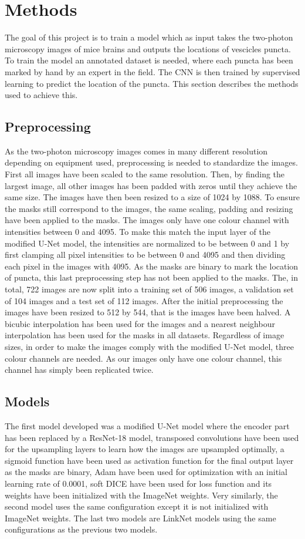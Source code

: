 \section{Methods}
The goal of this project is to train a model which as input takes the two-photon microscopy images of mice brains and outputs the locations of vescicles puncta. To train the model an annotated dataset is needed, where each puncta has been marked by hand by an expert in the field. The CNN is then trained by supervised learning to predict the location of the puncta. This section describes the methods used to achieve this.

\subsection{Preprocessing}
As the two-photon microscopy images comes in many different resolution depending on equipment used, preprocessing is needed to standardize the images. First all images have been scaled to the same resolution. Then, by finding the largest image, all other images has been padded with zeros until they achieve the same size. The images have then been resized to a size of 1024 by 1088. To ensure the masks still correspond to the images, the same scaling, padding and resizing have been applied to the masks. The images only have one colour channel with intensities between 0 and 4095. To make this match the input layer of the modified U-Net model, the intensities are normalized to be between 0 and 1 by first clamping all pixel intensities to be between 0 and 4095 and then dividing each pixel in the images with 4095. As the masks are binary to mark the location of puncta, this last preprocessing step has not been applied to the masks. The, in total, 722 images are now split into a training set of 506 images, a validation set of 104 images and a test set of 112 images. After the initial preprocessing the images have been resized to 512 by 544, that is the images have been halved. A bicubic interpolation has been used for the images and a nearest neighbour interpolation has been used for the masks in all datasets. Regardless of image sizes, in order to make the images comply with the modified U-Net model, three colour channels are needed. As our images only have one colour channel, this channel has simply been replicated twice.

\subsection{Models} \label{models}
The first model developed was a modified U-Net model where the encoder part has been replaced by a ResNet-18 model, transposed convolutions have been used for the upsampling layers to learn how the images are upsampled optimally, a sigmoid function have been used as activation function for the final output layer as the masks are binary, Adam have been used for optimization with an initial learning rate of 0.0001, soft DICE have been used for loss function and its weights have been initialized with the ImageNet weights. Very similarly, the second model uses the same configuration except it is not initialized with ImageNet weights. The last two models are LinkNet models using the same configurations as the previous two models.

